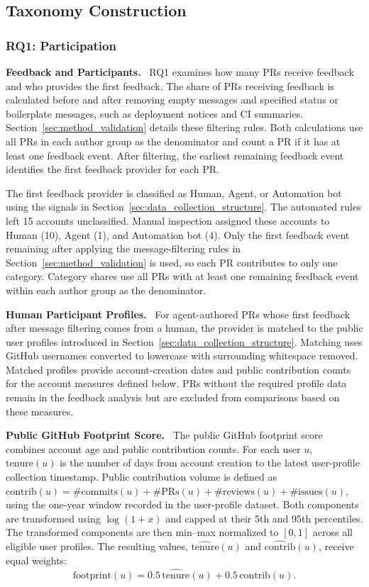 \documentclass[10pt,conference,anonymous]{IEEEtran}
\newcommand{\runinhead}[1]{\noindent\textbf{#1.}\ }
\begin{document}
\subsection{Taxonomy Construction}
\label{sec:method_taxonomy_construction}

\subsubsection{RQ1: Participation}
\label{sec:method_rq1_entry}

\runinhead{Feedback and Participants}
RQ1 examines how many PRs receive feedback and who provides the first feedback.
The share of PRs receiving feedback is calculated before and after removing empty messages and specified status or boilerplate messages, such as deployment notices and CI summaries.
Section~\ref{sec:method_validation} details these filtering rules.
Both calculations use all PRs in each author group as the denominator and count a PR if it has at least one feedback event.
After filtering, the earliest remaining feedback event identifies the first feedback provider for each PR.

The first feedback provider is classified as Human, Agent, or Automation bot using the signals in Section~\ref{sec:data_collection_structure}.
The automated rules left 15 accounts unclassified.
Manual inspection assigned these accounts to Human (10), Agent (1), and Automation bot (4).
Only the first feedback event remaining after applying the message-filtering rules in Section~\ref{sec:method_validation} is used, so each PR contributes to only one category.
Category shares use all PRs with at least one remaining feedback event within each author group as the denominator.

\runinhead{Human Participant Profiles}
For agent-authored PRs whose first feedback after message filtering comes from a human, the provider is matched to the public user profiles introduced in Section~\ref{sec:data_collection_structure}.
Matching uses GitHub usernames converted to lowercase with surrounding whitespace removed.
Matched profiles provide account-creation dates and public contribution counts for the account measures defined below.
PRs without the required profile data remain in the feedback analysis but are excluded from comparisons based on these measures.

\runinhead{Public GitHub Footprint Score}
The public GitHub footprint score combines account age and public contribution counts.
For each user $u$, $\mathrm{tenure}(u)$ is the number of days from account creation to the latest user-profile collection timestamp.
Public contribution volume is defined as
$\mathrm{contrib}(u)=\#\mathrm{commits}(u)+\#\mathrm{PRs}(u)+\#\mathrm{reviews}(u)+\#\mathrm{issues}(u)$,
using the one-year window recorded in the user-profile dataset.
Both components are transformed using $\log(1+x)$ and capped at their 5th and 95th percentiles.
The transformed components are then min--max normalized to $[0,1]$ across all eligible user profiles.
The resulting values, $\widehat{\mathrm{tenure}}(u)$ and $\widehat{\mathrm{contrib}}(u)$, receive equal weights:
\[
\mathrm{footprint}(u)
=0.5\,\widehat{\mathrm{tenure}}(u)
+0.5\,\widehat{\mathrm{contrib}}(u).
\]
\end{document}
